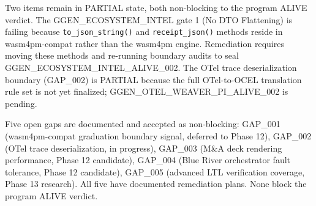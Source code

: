 Two items remain in PARTIAL state, both non-blocking to the program ALIVE verdict. The
GGEN\_ECOSYSTEM\_INTEL gate 1 (No DTO Flattening) is failing because \texttt{to\_json\_string()} and
\texttt{receipt\_json()} methods reside in wasm4pm-compat rather than the wasm4pm engine. Remediation
requires moving these methods and re-running boundary audits to seal GGEN\_ECOSYSTEM\_INTEL\_ALIVE\_002.
The OTel trace deserialization boundary (GAP\_002) is PARTIAL because the full OTel-to-OCEL
translation rule set is not yet finalized; GGEN\_OTEL\_WEAVER\_PI\_ALIVE\_002 is pending.

Five open gaps are documented and accepted as non-blocking: GAP\_001 (wasm4pm-compat graduation
boundary signal, deferred to Phase 12), GAP\_002 (OTel trace deserialization, in progress), GAP\_003
(M\&A deck rendering performance, Phase 12 candidate), GAP\_004 (Blue River orchestrator fault
tolerance, Phase 12 candidate), GAP\_005 (advanced LTL verification coverage, Phase 13 research).
All five have documented remediation plans. None block the program ALIVE verdict.

